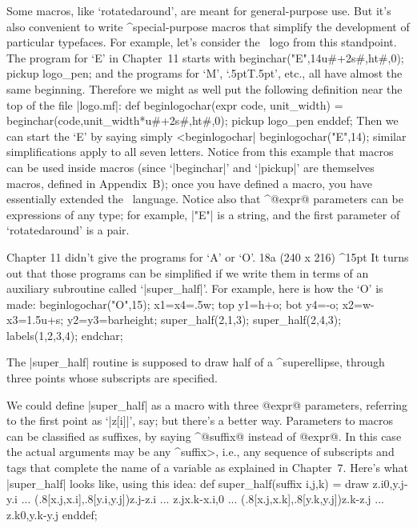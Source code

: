 {{{{Some macros, like `rotatedaround', are meant for general-purpose use.
But it's also convenient to write ^{special-purpose macros} that simplify
the development of particular typefaces. For example, let's consider the
\MF\ logo from this standpoint. The program for `{\manual E}' in
Chapter~11 starts with
\begintt
beginchar("E",14u#+2s#,ht#,0); pickup logo_pen;
\endtt
and the programs for `{\manual M}', `\kern.5pt{\manual T}\kern.5pt',
etc., all have almost the same beginning. Therefore we might as
well put the following definition near the top of the file |logo.mf|:
\begintt
def beginlogochar(expr code, unit_width) =
 beginchar(code,unit_width*u#+2s#,ht#,0);
 pickup logo_pen enddef;
\endtt
Then we can start the `{\manual E}' by saying simply ^^|beginlogochar|
\begintt
beginlogochar("E",14);
\endtt
similar simplifications apply to all seven letters. Notice from
this example that macros can be used inside macros (since `|beginchar|'
and `|pickup|' are themselves macros, defined in Appendix~B\null); once you
have defined a macro, you have essentially extended the \MF\ language.
Notice also that ^@expr@ parameters can be expressions of any type;
for example, |"E"| is a string, and the first parameter of
`rotatedaround' is a pair.

\decreasehsize 48mm
Chapter 11 didn't give the programs for `{\manual A}' or `{\manual O}'.
\rightfig 18a ({240\apspix} x {216\apspix}) ^15pt
It turns out that those programs can be simplified if we write
them in terms of an auxiliary subroutine called `|super_half|'.
For example, here is how the `{\manual O}' is made:
\begintt
beginlogochar("O",15);
x1=x4=.5w; top y1=h+o; bot y4=-o;
x2=w-x3=1.5u+s; y2=y3=barheight;
super_half(2,1,3);
super_half(2,4,3);
labels(1,2,3,4); endchar;
\endtt

\restorehsize\medbreak\noindent
The |super_half| routine is supposed to draw half of a ^{superellipse},
through three points whose subscripts are specified.

\restorehsize
We could define |super_half| as a macro with three @expr@ parameters,
referring to the first point as `|z[i]|', say; but there's a better way.
Parameters to macros can be classified as suffixes, by saying ^@suffix@
instead of @expr@. In this case
the actual arguments may be any ^\<suffix>, i.e., any sequence of
subscripts and tags that complete the name of a variable as explained
in Chapter~7. Here's what |super_half| looks like, using this idea:
\begintt
def super_half(suffix i,j,k) =
 draw z.i{0,y.j-y.i}
  ... (.8[x.j,x.i],.8[y.i,y.j]){z.j-z.i}
  ... z.j{x.k-x.i,0}
  ... (.8[x.j,x.k],.8[y.k,y.j]){z.k-z.j}
  ... z.k{0,y.k-y.j} enddef;
\endtt

}}}}
